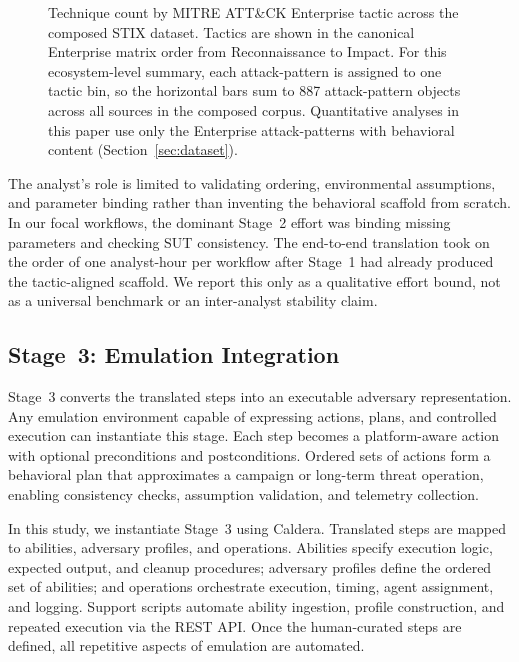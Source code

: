 \documentclass[sigconf]{acmart}
\newcommand{\stix}{STIX\xspace}
\newcommand{\attack}{ATT\&CK\xspace}
\newcommand{\caldera}{Caldera\xspace}
\begin{document}
\begin{figure}[htpb]
  \centering
  
  \caption{Technique count by MITRE \attack{} Enterprise tactic across the composed \stix{} dataset. Tactics are shown in the canonical Enterprise matrix order from Reconnaissance to Impact. For this ecosystem-level summary, each attack-pattern is assigned to one tactic bin, so the horizontal bars sum to 887 attack-pattern objects across all sources in the composed corpus. Quantitative analyses in this paper use only the \nAttackPatternObjects{} Enterprise attack-patterns with behavioral content (Section~\ref{sec:dataset}).}
  \label{fig:full_chart}
\end{figure}

The analyst's role is limited to validating ordering, environmental assumptions, and parameter binding rather than inventing the behavioral scaffold from scratch. In our focal workflows, the dominant Stage~2 effort was binding missing parameters and checking SUT consistency. The end-to-end translation took on the order of one analyst-hour per workflow after Stage~1 had already produced the tactic-aligned scaffold. We report this only as a qualitative effort bound, not as a universal benchmark or an inter-analyst stability claim.


\subsection{Stage~3: Emulation Integration}
\label{sec:stage3}

Stage~3 converts the translated steps into an executable adversary representation. Any emulation environment capable of expressing actions, plans, and controlled execution can instantiate this stage. Each step becomes a platform-aware action with optional preconditions and postconditions. Ordered sets of actions form a behavioral plan that approximates a campaign or long-term threat operation, enabling consistency checks, assumption validation, and telemetry collection.

In this study, we instantiate Stage~3 using \caldera{}. Translated steps are mapped to abilities, adversary profiles, and operations. Abilities specify execution logic, expected output, and cleanup procedures; adversary profiles define the ordered set of abilities; and operations orchestrate execution, timing, agent assignment, and logging. Support scripts automate ability ingestion, profile construction, and repeated execution via the REST API. Once the human-curated steps are defined, all repetitive aspects of emulation are automated.
\end{document}
